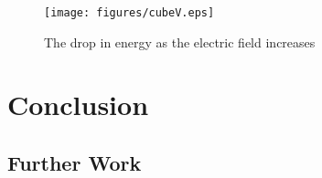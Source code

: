 \documentclass[authoryearcitations]{UoYCSproject}
\begin{document}
\begin{figure}
\centering
\texttt{[image: figures/cubeV.eps]}
\caption{The drop in energy as the electric field increases}
\label{cubeV}
\end{figure}




\chapter{Conclusion}



\section{Further Work}


\end{document}
